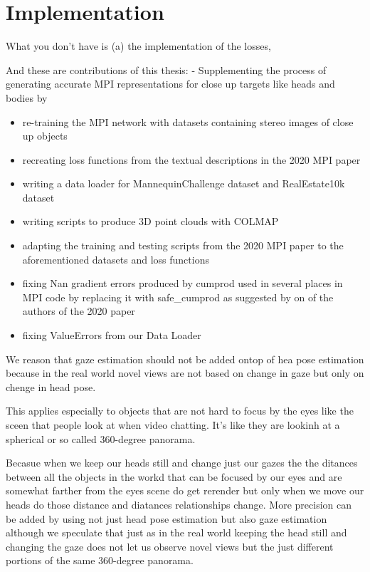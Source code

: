 \section{Implementation}\label{sec:implementation} 


What you don't have is (a) the implementation of the losses, 

And these are contributions of this thesis: -
Supplementing the process of generating accurate MPI representations for close up targets like heads and bodies by 
\begin{itemize}
    \item re-training the MPI network with datasets containing stereo images of close up objects  
    \item recreating loss functions from the textual descriptions in the 2020 MPI paper
    \item writing a data loader for MannequinChallenge dataset and RealEstate10k dataset
    \item writing scripts to produce 3D point clouds with COLMAP
    \item adapting the training and testing scripts from the 2020 MPI paper to the aforementioned datasets and loss functions
    \item fixing Nan gradient errors produced by cumprod used in several places in MPI code by replacing it with safe\_cumprod as suggested by on of the authors of the 2020 paper
    \item fixing ValueErrors from our Data Loader
\end{itemize}

We reason that gaze estimation should not be added ontop of hea pose estimation because in the real world novel views are not based on change in gaze but only on chenge in head pose.

This applies especially to  objects that are not hard to focus by the eyes like the sceen that people look at when video chatting. It's like they are lookinh at a spherical or so called 360-degree panorama.

Becasue when we keep our heads still and change just our gazes the the ditances between all the objects in the workd that can be focused by our eyes and are somewhat farther from the eyes scene do get rerender but only when we move our heads do those distance and diatances relationships change. 
More precision can be added by using not just head pose estimation but also gaze estimation although we speculate that just as in the real world keeping the head still and changing the gaze does not let us observe novel views but the just different portions of the same 360-degree panorama.



